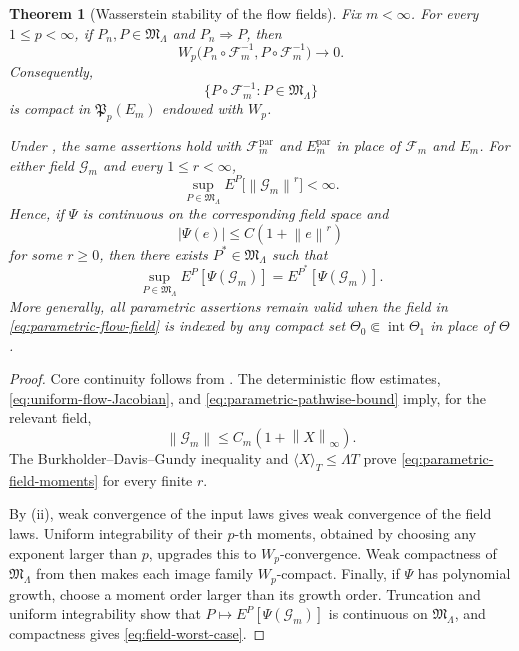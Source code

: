 \documentclass[11pt,reqno]{amsart}
\theoremstyle{plain}
\newtheorem{theorem}{Theorem}[section]
\theoremstyle{definition}
\newcommand{\norm}[1]{\left\lVert #1\right\rVert}
\begin{document}
\begin{theorem}[Wasserstein stability of the flow fields]
\label{thm:flow-law-transfer}
Fix \(m<\infty\).  For every \(1\le p<\infty\), if
\(P_n,P\in\mathfrak M_\Lambda\) and \(P_n\Rightarrow P\), then
\begin{equation}\label{eq:flow-field-Wp}
  W_p\bigl(P_n\circ\mathscr F_m^{-1},
            P\circ\mathscr F_m^{-1}\bigr)\longrightarrow0.
\end{equation}
Consequently,
\[
  \{P\circ\mathscr F_m^{-1}:P\in\mathfrak M_\Lambda\}
\]
is compact in \(\mathfrak P_p(E_m)\) endowed with \(W_p\).

Under , the same assertions hold with
\(\mathscr F_m^{\mathrm{par}}\) and \(E_m^{\mathrm{par}}\) in place of
\(\mathscr F_m\) and \(E_m\).  For either field \(\mathscr G_m\) and
every \(1\le r<\infty\),
\begin{equation}\label{eq:parametric-field-moments}
  \sup_{P\in\mathfrak M_\Lambda}
  E^P\bigl[\norm{\mathscr G_m}^{r}\bigr]<\infty.
\end{equation}
Hence, if \(\Psi\) is continuous on the corresponding field space and
\[
  |\Psi(e)|\le C(1+\norm e^r)
\]
for some \(r\ge0\), then there exists \(P^*\in\mathfrak M_\Lambda\)
such that
\begin{equation}\label{eq:field-worst-case}
  \sup_{P\in\mathfrak M_\Lambda}E^P[\Psi(\mathscr G_m)]
  =E^{P^*}[\Psi(\mathscr G_m)].
\end{equation}
More generally, all parametric assertions remain valid when the field in
\eqref{eq:parametric-flow-field} is indexed by any compact set
\(\Theta_0\Subset\operatorname{int}\Theta_1\) in place of \(\Theta\).
\end{theorem}

\begin{proof}
Core continuity follows from
.  The deterministic flow
estimates, \eqref{eq:uniform-flow-Jacobian}, and
\eqref{eq:parametric-pathwise-bound} imply, for the relevant field,
\[
  \norm{\mathscr G_m}\le C_m(1+\norm X_\infty).
\]
The Burkholder--Davis--Gundy inequality and
\(\langle X\rangle_T\le\Lambda T\) prove
\eqref{eq:parametric-field-moments} for every finite \(r\).

By (ii), weak convergence of the input laws gives
weak convergence of the field laws.  Uniform integrability of their
\(p\)-th moments, obtained by choosing any exponent larger than \(p\),
upgrades this to \(W_p\)-convergence.  Weak compactness of
\(\mathfrak M_\Lambda\) from  then makes each
image family \(W_p\)-compact.  Finally, if \(\Psi\) has polynomial growth,
choose a moment order larger than its growth order.  Truncation and uniform
integrability show that
\(P\mapsto E^P[\Psi(\mathscr G_m)]\) is continuous on
\(\mathfrak M_\Lambda\), and compactness gives \eqref{eq:field-worst-case}.
\end{proof}
\end{document}
